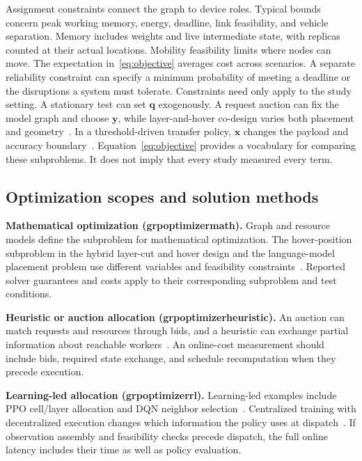 \documentclass[journal]{IEEEtran}
\newcommand{\groupcite}[2]{\csname grp#1#2\endcsname}
\begin{document}
Assignment constraints connect the graph to device roles. Typical bounds concern peak working memory, energy, deadline, link feasibility, and vehicle separation. Memory includes weights and live intermediate state, with replicas counted at their actual locations. Mobility feasibility limits where nodes can move. The expectation in~\eqref{eq:objective} averages cost across scenarios. A separate reliability constraint can specify a minimum probability of meeting a deadline or the disruptions a system must tolerate. Constraints need only apply to the study setting. A stationary test can set $\mathbf{q}$ exogenously. A request auction can fix the model graph and choose $\mathbf{y}$, while layer-and-hover co-design varies both placement and geometry~\cite{R0006,R0058}. In a threshold-driven transfer policy, $\mathbf{x}$ changes the payload and accuracy boundary~\cite{R0080}. Equation~\ref{eq:objective} provides a vocabulary for comparing these subproblems. It does not imply that every study measured every term.

\subsection{Optimization scopes and solution methods}
\textbf{Mathematical optimization (\groupcite{optimizer}{math}).}
Graph and resource models define the subproblem for mathematical optimization. The hover-position subproblem in the hybrid layer-cut and hover design and the language-model placement problem use different variables and feasibility constraints~\cite{R0006,R0074}. Reported solver guarantees and costs apply to their corresponding subproblem and test conditions.

\textbf{Heuristic or auction allocation (\groupcite{optimizer}{heuristic}).}
An auction can match requests and resources through bids, and a heuristic can exchange partial information about reachable workers~\cite{R0058,R0077}. An online-cost measurement should include bids, required state exchange, and schedule recomputation when they precede execution.

\textbf{Learning-led allocation (\groupcite{optimizer}{rl}).}
Learning-led examples include PPO cell/layer allocation and DQN neighbor selection~\cite{R0019,R0092}. Centralized training with decentralized execution changes which information the policy uses at dispatch~\cite{R0106}. If observation assembly and feasibility checks precede dispatch, the full online latency includes their time as well as policy evaluation.
\end{document}
